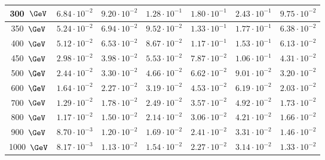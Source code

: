 \begin{table}[!h]
\begin{center}
{\begin{tabular}{|c|c|c|c|c|c|c|}
\hline
               300~$\GeV$ &               $6.84 \cdot 10^{-2}$ &               $9.20 \cdot 10^{-2}$ &               $1.28 \cdot 10^{-1}$ &               $1.80 \cdot 10^{-1}$ &               $2.43 \cdot 10^{-1}$ &               $9.75 \cdot 10^{-2}$  \\
\hline
               350~$\GeV$ &               $5.24 \cdot 10^{-2}$ &               $6.94 \cdot 10^{-2}$ &               $9.52 \cdot 10^{-2}$ &               $1.33 \cdot 10^{-1}$ &               $1.77 \cdot 10^{-1}$ &               $6.38 \cdot 10^{-2}$  \\
\hline
               400~$\GeV$ &               $5.12 \cdot 10^{-2}$ &               $6.53 \cdot 10^{-2}$ &               $8.67 \cdot 10^{-2}$ &               $1.17 \cdot 10^{-1}$ &               $1.53 \cdot 10^{-1}$ &               $6.13 \cdot 10^{-2}$  \\
\hline
               450~$\GeV$ &               $2.98 \cdot 10^{-2}$ &               $3.98 \cdot 10^{-2}$ &               $5.53 \cdot 10^{-2}$ &               $7.87 \cdot 10^{-2}$ &               $1.06 \cdot 10^{-1}$ &               $4.31 \cdot 10^{-2}$  \\
\hline
               500~$\GeV$ &               $2.44 \cdot 10^{-2}$ &               $3.30 \cdot 10^{-2}$ &               $4.66 \cdot 10^{-2}$ &               $6.62 \cdot 10^{-2}$ &               $9.01 \cdot 10^{-2}$ &               $3.20 \cdot 10^{-2}$  \\
\hline
               600~$\GeV$ &               $1.64 \cdot 10^{-2}$ &               $2.27 \cdot 10^{-2}$ &               $3.19 \cdot 10^{-2}$ &               $4.53 \cdot 10^{-2}$ &               $6.19 \cdot 10^{-2}$ &               $2.03 \cdot 10^{-2}$  \\
\hline
               700~$\GeV$ &               $1.29 \cdot 10^{-2}$ &               $1.78 \cdot 10^{-2}$ &               $2.49 \cdot 10^{-2}$ &               $3.57 \cdot 10^{-2}$ &               $4.92 \cdot 10^{-2}$ &               $1.73 \cdot 10^{-2}$  \\
\hline
               800~$\GeV$ &               $1.17 \cdot 10^{-2}$ &               $1.50 \cdot 10^{-2}$ &               $2.14 \cdot 10^{-2}$ &               $3.06 \cdot 10^{-2}$ &               $4.21 \cdot 10^{-2}$ &               $1.66 \cdot 10^{-2}$  \\
\hline
               900~$\GeV$ &               $8.70 \cdot 10^{-3}$ &               $1.20 \cdot 10^{-2}$ &               $1.69 \cdot 10^{-2}$ &               $2.41 \cdot 10^{-2}$ &               $3.31 \cdot 10^{-2}$ &               $1.46 \cdot 10^{-2}$  \\
\hline
              1000~$\GeV$ &               $8.17 \cdot 10^{-3}$ &               $1.13 \cdot 10^{-2}$ &               $1.54 \cdot 10^{-2}$ &               $2.27 \cdot 10^{-2}$ &               $3.14 \cdot 10^{-2}$ &               $1.33 \cdot 10^{-2}$  \\
\hline
 \end{tabular}
} %
    \label{bbH-limit}
  \end{center}
\end{table}

